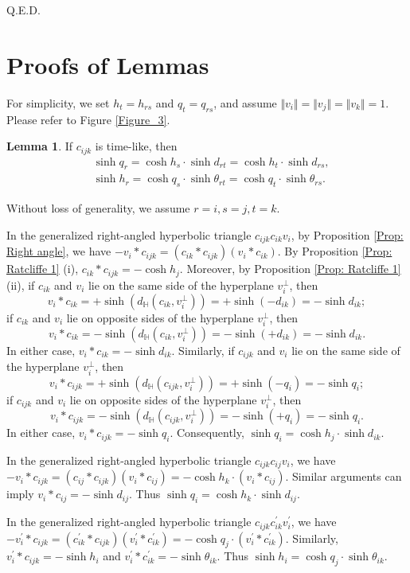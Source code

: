 \documentclass[12pt]{amsart}
\theoremstyle{definition}
\newtheorem{lemma}[theorem]{Lemma}
\def\qed{\hfill{Q.E.D.}\smallskip}
\begin{document}
\qed


\appendix
\section{Proofs of Lemmas}\label{appendix a}

For simplicity, we set $h_t=h_{rs}$ and $q_t=q_{rs}$, and assume $\Vert v_i\Vert =\Vert v_j\Vert =\Vert v_k\Vert =1$.
Please refer to Figure \ref{Figure_3}.

\begin{lemma}
If $c_{ijk}$ is time-like, then
\begin{align*}
&\sinh q_r=\cosh h_s\cdot\sinh d_{rt}=\cosh h_t\cdot\sinh d_{rs},\\
&\sinh h_r=\cosh q_s\cdot\sinh \theta_{rt}=\cosh q_t\cdot\sinh \theta_{rs}.
\end{align*}
\end{lemma}
\proof
Without loss of generality, we assume $r=i, s=j, t=k$.

In the generalized right-angled hyperbolic triangle $c_{ijk}c_{ik}v_i$,
by Proposition \ref{Prop: Right angle},
we have $-v_i\ast c_{ijk}=(c_{ik}\ast c_{ijk})(v_i\ast c_{ik})$.
By Proposition \ref{Prop: Ratcliffe 1} (i), $c_{ik}\ast c_{ijk}=-\cosh h_j$.
Moreover, by Proposition \ref{Prop: Ratcliffe 1} (ii),
if $c_{ik}$ and $v_i$ lie on the same side of the hyperplane $v_i^\bot$,
then $$v_i\ast c_{ik}=+\sinh(d_\mathbb{H}(c_{ik},v_i^\bot))=+\sinh (-d_{ik})=-\sinh d_{ik};$$
if $c_{ik}$ and $v_i$ lie on opposite sides of the hyperplane $v_i^\bot$, then
$$v_i\ast c_{ik}=-\sinh(d_\mathbb{H}(c_{ik},v_i^\bot))=-\sinh (+d_{ik})=-\sinh d_{ik}.$$
In either case, $v_i\ast c_{ik}=-\sinh d_{ik}$.
Similarly,
if $c_{ijk}$ and $v_i$ lie on the same side of the hyperplane $v_i^\bot$,
then $$v_i\ast c_{ijk}=+\sinh(d_\mathbb{H}(c_{ijk},v_i^\bot))=+\sinh (-q_i)=-\sinh q_i;$$
if $c_{ijk}$ and $v_i$ lie on opposite sides of the hyperplane $v_i^\bot$, then $$v_i\ast c_{ijk}=-\sinh(d_\mathbb{H}(c_{ijk},v_i^\bot))=-\sinh (+q_i)=-\sinh q_i.$$
In either case, $v_i\ast c_{ijk}=-\sinh q_i$.
Consequently, $\sinh q_i=\cosh h_j\cdot\sinh d_{ik}$.

In the generalized right-angled hyperbolic triangle $c_{ijk}c_{ij}v_i$,
we have $-v_i\ast c_{ijk}=(c_{ij}\ast c_{ijk})(v_i\ast c_{ij})=-\cosh h_k\cdot(v_i\ast c_{ij})$.
Similar arguments can imply $v_i\ast c_{ij}=-\sinh d_{ij}$.
Thus $\sinh q_i=\cosh h_k\cdot\sinh d_{ij}$.

In the generalized right-angled hyperbolic triangle $c_{ijk}c^\prime_{ik}v^\prime_i$,
we have $-v^\prime_i\ast c_{ijk}=(c^\prime_{ik}\ast c_{ijk})(v^\prime_i\ast c^\prime_{ik})=-\cosh q_j\cdot(v^\prime_i\ast c^\prime_{ik})$.
Similarly, $v^\prime_i\ast c_{ijk}=-\sinh h_i$ and
$v^\prime_i\ast c^\prime_{ik}=-\sinh \theta_{ik}$.
Thus $\sinh h_i=\cosh q_j\cdot\sinh \theta_{ik}$.
\end{document}
